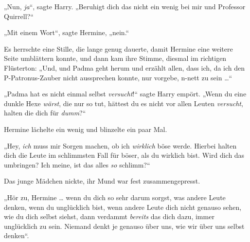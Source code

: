 „Nun, \emph{ja}“, sagte Harry.
„Beruhigt dich das nicht ein wenig bei mir und Professor Quirrell?“

„Mit einem Wort“, sagte Hermine, „nein.“

Es herrschte eine Stille, die lange genug dauerte, damit Hermine eine weitere Seite umblättern konnte, und dann kam ihre Stimme, diesmal im richtigen Flüsterton:
„Und, und Padma geht herum und erzählt allen, dass ich, da ich den P-Patronus-Zauber nicht aussprechen konnte, nur vorgebe, n-nett zu sein …“

„Padma hat es nicht einmal selbst \emph{versucht}!“ sagte Harry empört.
„Wenn du eine dunkle Hexe \emph{wärst}, die nur so tut, hättest du es nicht vor allen Leuten \emph{versucht}, halten die dich für \emph{dumm}?“

Hermine lächelte ein wenig und blinzelte ein paar Mal.

„Hey, \emph{ich} muss mir Sorgen machen, ob ich \emph{wirklich} böse werde. Hierbei halten dich die Leute im schlimmsten Fall für böser, als du wirklich bist. Wird dich das umbringen? Ich meine, ist das alles \emph{so} schlimm?“

Das junge Mädchen nickte, ihr Mund war fest zusammengepresst.

„Hör zu, Hermine … wenn du dich so sehr darum sorgst, was andere Leute denken, wenn du unglücklich bist, wenn andere Leute dich nicht genauso sehen, wie du dich selbst siehst, dann verdammt \emph{bereits} das dich dazu, immer unglücklich zu sein. Niemand denkt je genauso über uns, wie wir über uns selbst denken“.

